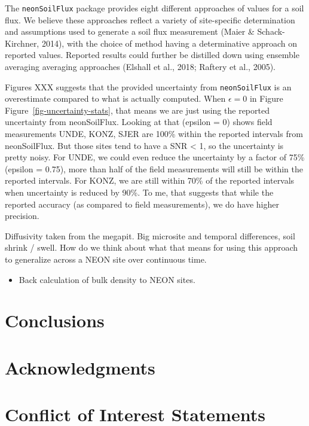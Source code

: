 \documentclass[
  letterpaper,
  DIV=11,
  numbers=noendperiod]{scrartcl}
\providecommand{\tightlist}{%
  \setlength{\itemsep}{0pt}\setlength{\parskip}{0pt}}\usepackage{longtable,booktabs,array}
\begin{document}
The \texttt{neonSoilFlux} package provides eight different approaches of
values for a soil flux. We believe these approaches reflect a variety of
site-specific determination and assumptions used to generate a soil flux
measurement (Maier \& Schack-Kirchner, 2014), with the choice of method
having a determinative approach on reported values. Reported results
could further be distilled down using ensemble averaging averaging
approaches (Elshall et al., 2018; Raftery et al., 2005).

Figures XXX suggests that the provided uncertainty from
\texttt{neonSoilFlux} is an overestimate compared to what is actually
computed. When \(\epsilon=0\) in Figure
Figure~\ref{fig-uncertainty-stats}, that means we are just using the
reported uncertainty from neonSoilFlux. Looking at that (epsilon = 0)
shows field measurements UNDE, KONZ, SJER are 100\% within the reported
intervals from neonSoilFlux. But those sites tend to have a SNR
\textless{} 1, so the uncertainty is pretty noisy. For UNDE, we could
even reduce the uncertainty by a factor of 75\% (epsilon = 0.75), more
than half of the field measurements will still be within the reported
intervals. For KONZ, we are still within 70\% of the reported intervals
when uncertainty is reduced by 90\%. To me, that suggests that while the
reported accuracy (as compared to field measurements), we do have higher
precision.

Diffusivity taken from the megapit. Big microsite and temporal
differences, soil shrink / swell. How do we think about what that means
for using this approach to generalize across a NEON site over continuous
time.

\begin{itemize}
\tightlist
\item
  Back calculation of bulk density to NEON sites.
\end{itemize}

\section{Conclusions}\label{conclusions}

\section{Acknowledgments}\label{acknowledgments}

\section{Conflict of Interest
Statements}\label{conflict-of-interest-statements}
\end{document}
